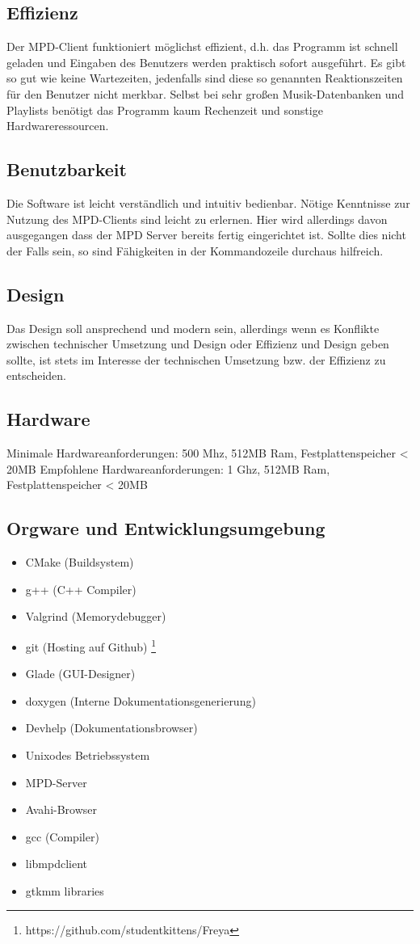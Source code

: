 \subsection{Effizienz}
Der MPD-Client funktioniert möglichst effizient, d.h. das Programm ist schnell geladen und Eingaben des Benutzers
werden praktisch sofort ausgeführt. Es gibt so gut wie keine Wartezeiten, jedenfalls sind diese 
so genannten Reaktionszeiten für den Benutzer nicht merkbar. Selbst bei sehr großen Musik-Datenbanken
und Playlists benötigt das Programm kaum Rechenzeit und sonstige Hardwareressourcen.

\subsection{Benutzbarkeit}
Die Software ist leicht verständlich und intuitiv bedienbar. Nötige Kenntnisse zur Nutzung des 
MPD-Clients sind leicht zu erlernen. Hier wird allerdings davon ausgegangen dass der MPD Server bereits
fertig eingerichtet ist. Sollte dies nicht der Falls sein, so sind Fähigkeiten in der Kommandozeile 
durchaus hilfreich.

\subsection{Design}
Das Design soll ansprechend und modern sein, allerdings wenn es Konflikte zwischen technischer Umsetzung 
und Design oder Effizienz und Design geben sollte, ist stets im Interesse der technischen Umsetzung bzw. 
der Effizienz zu entscheiden.
\subsection{Hardware}
Minimale Hardwareanforderungen: 500 Mhz, 512MB Ram, Festplattenspeicher < 20MB
Empfohlene Hardwareanforderungen: 1 Ghz, 512MB Ram, Festplattenspeicher < 20MB

\subsection{Orgware und Entwicklungsumgebung}
\begin{itemize}
    \item CMake (Buildsystem)
    \item g++ (C++ Compiler)
    \item Valgrind (Memorydebugger)
    \item git (Hosting auf Github) \footnote{https://github.com/studentkittens/Freya}
    \item Glade (GUI-Designer)
    \item doxygen  (Interne Dokumentationsgenerierung)
    \item Devhelp (Dokumentationsbrowser)
    \item Unixodes Betriebssystem
    \item MPD-Server	
    \item Avahi-Browser
    \item gcc (Compiler)
    \item libmpdclient
    \item gtkmm libraries
\end{itemize}
\newpage

